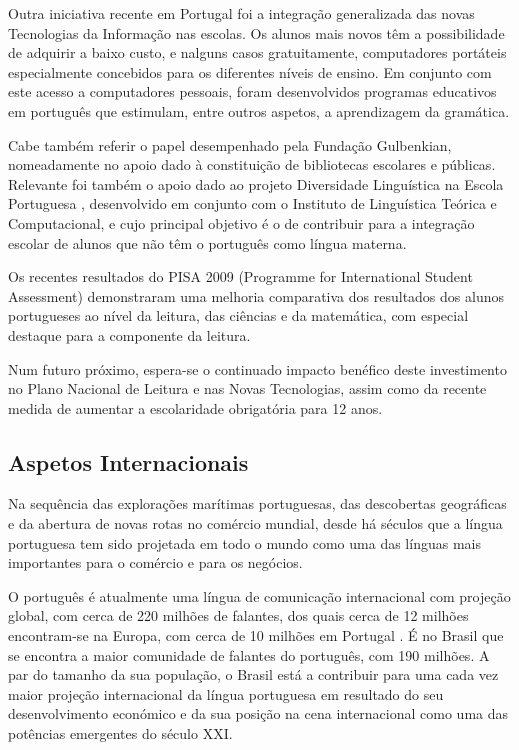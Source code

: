 \begin{multicols}{2}
Outra iniciativa recente em Portugal foi a integração generalizada das novas Tecnologias da Informação nas escolas.
Os alunos mais novos têm a possibilidade de adquirir a baixo custo, e nalguns casos gratuitamente, 
computadores portáteis especialmente concebidos para os diferentes níveis de ensino. 
Em conjunto com este acesso a computadores pessoais, foram desenvolvidos programas educativos em português que estimulam, entre outros aspetos, a aprendizagem da gramática.


Cabe também referir o papel desempenhado pela Fundação Gulbenkian, nomeadamente no apoio dado à constituição de bibliotecas escolares e públicas. 
Relevante foi também o apoio dado ao projeto Diversidade Linguística na Escola Portuguesa \cite{gulbenkian2}, desenvolvido em conjunto com o Instituto de Linguística Teórica e Computacional, e cujo principal objetivo é o de contribuir para a integração escolar de alunos que não têm o português como língua materna.

Os recentes resultados do PISA 2009 (Programme for International Student Assessment) demonstraram uma melhoria comparativa dos resultados dos alunos portugueses ao nível da leitura, das ciências e da matemática, com especial destaque para a componente da leitura. 

Num futuro próximo, espera-se o continuado impacto benéfico deste investimento no Plano Nacional de Leitura e nas Novas Tecnologias, assim como da recente medida de aumentar a escolaridade obrigatória para 12 anos.

\subsection{Aspetos Internacionais}

Na sequência das explorações marítimas portuguesas, das descobertas geográficas e da abertura de novas rotas no comércio mundial, 
desde há séculos que a língua portuguesa tem sido projetada em todo o mundo como uma das línguas mais importantes para o comércio e 
para os negócios.

O português é atualmente uma língua de comunicação internacional com projeção global, com cerca de 220 milhões de falantes, dos quais cerca de 12 milhões encontram-se na Europa, com cerca de 10 milhões em Portugal \cite{census}. É no Brasil que se encontra a maior comunidade de falantes do português, com 190 milhões. 
A par do tamanho da sua população, o Brasil está a contribuir para uma cada vez maior projeção internacional da língua portuguesa em resultado do seu desenvolvimento económico e da sua posição na cena internacional como uma das potências emergentes do século XXI.


\end{multicols}
